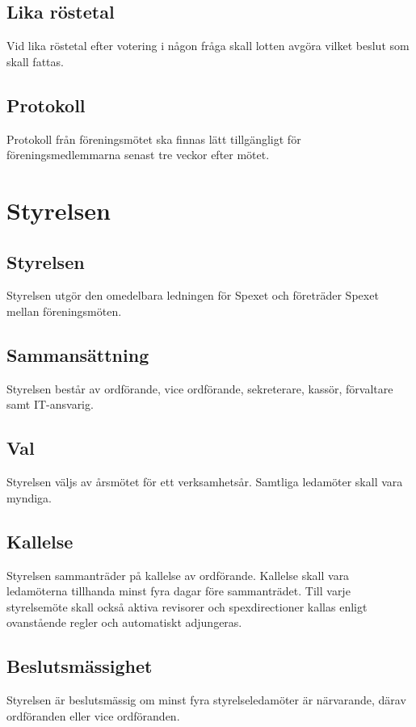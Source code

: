 \documentclass[a4paper]{article}
\begin{document}
\subsection{Lika röstetal}
Vid lika röstetal efter votering i någon fråga skall lotten avgöra vilket beslut som skall fattas.

\subsection{Protokoll}
Protokoll från föreningsmötet ska finnas lätt tillgängligt för föreningsmedlemmarna senast tre veckor efter mötet.

\section{Styrelsen}
\label{section:styrelsen}

\subsection{Styrelsen}
Styrelsen utgör den omedelbara ledningen för Spexet och företräder Spexet mellan föreningsmöten.

\subsection{Sammansättning}
Styrelsen består av ordförande, vice ordförande, sekreterare, kassör, förvaltare samt IT-ansvarig.

\subsection{Val}
Styrelsen väljs av årsmötet för ett verksamhetsår. Samtliga ledamöter skall vara myndiga.

\subsection{Kallelse}
Styrelsen sammanträder på kallelse av ordförande. Kallelse skall vara ledamöterna tillhanda minst fyra dagar före sammanträdet. Till varje styrelsemöte skall också aktiva revisorer och spexdirectioner kallas enligt ovanstående regler och automatiskt adjungeras.

\subsection{Beslutsmässighet}
Styrelsen är beslutsmässig om minst fyra styrelseledamöter är närvarande, därav ordföranden eller vice ordföranden.
\end{document}
